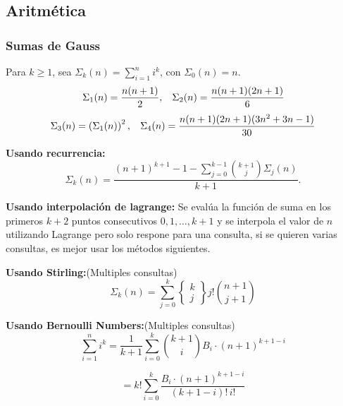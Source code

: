 

\subsection{Aritmética}


\subsubsection{Sumas de Gauss}
Para $k\ge1$, sea
$\displaystyle\Sigma_k(n)=\sum_{i=1}^n i^k$, con $\Sigma_0(n)=n$.
\[
\Sigma_1(n)=\frac{n(n+1)}{2} ,\hspace{3mm}
\Sigma_2(n)=\frac{n(n+1)(2n+1)}{6} 
\]
\[
\Sigma_3(n)=\left(\Sigma_1(n)\right)^2, \hspace{3mm}
\Sigma_4(n)= \frac{n(n+1)(2n+1)(3n^2+3n-1)}{30} 
\]

\textbf{Usando recurrencia:}
\[
\Sigma_k(n)=\frac{(n+1)^{k+1}-1-
\sum_{j=0}^{k-1}\binom{k+1}{j}\Sigma_j(n)}{k+1}.
\]


\textbf{Usando interpolación de lagrange:} Se evalúa la función de suma en los primeros $k+2$ puntos consecutivos $0, 1, \dots, k+1$ y se interpola el valor de $n$ utilizando Lagrange pero solo respone para una consulta, si se quieren varias consultas, es mejor usar los métodos siguientes.


\newcommand{\stirling}[2]{\left\{ \begin{matrix} #1 \\ #2 \end{matrix} \right\}}
\textbf{Usando Stirling:}(Multiples consultas)
\[
\Sigma_k(n) = \sum_{j=0}^k \stirling{k}{j} j! \binom{n+1}{j+1}
\]


\textbf{Usando Bernoulli Numbers:}(Multiples consultas)
\[
\sum_{i=1}^{n} i^k = \frac{1}{k+1} \sum_{i=0}^{k} \binom{k+1}{i} B_i \cdot (n+1)^{k+1-i} 
\]
\begin{extended}[]
\[
= k! \sum_{i=0}^{k} \frac{B_i \cdot (n+1)^{k+1-i}}{(k+1-i)! \, i!}
\]
\end{extended}

